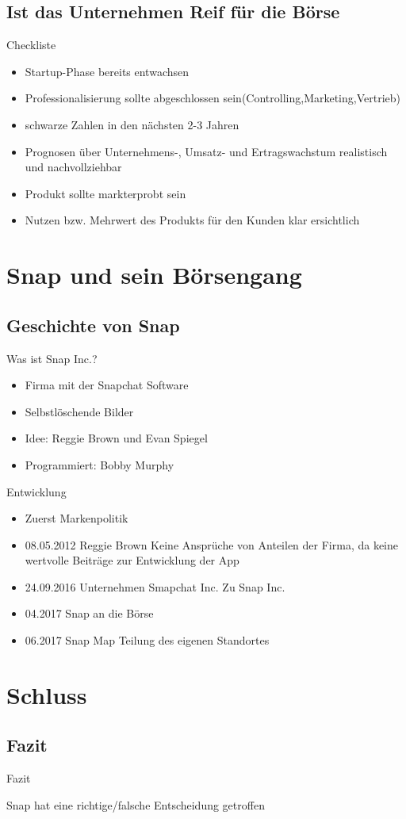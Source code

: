 \documentclass{beamer}
\begin{document}
\subsection{Ist das Unternehmen Reif für die Börse}
\begin{frame} {Checkliste}
\begin{itemize}
	\item Startup-Phase bereits entwachsen  
	\item Professionalisierung sollte abgeschlossen sein(Controlling,Marketing,Vertrieb)  
	\item schwarze Zahlen in den nächsten 2-3 Jahren   
	\item Prognosen über Unternehmens-, Umsatz- und Ertragswachstum realistisch und nachvollziehbar 
	 \item Produkt sollte markterprobt sein 
	 \item Nutzen bzw. Mehrwert des Produkts für den Kunden  klar ersichtlich 
\end{itemize}
\end{frame}


\section{Snap und sein Börsengang}

\subsection{Geschichte von Snap}
\begin{frame} {Was ist Snap Inc.?}
\begin{itemize}
	\item Firma mit der Snapchat Software 
	\item  Selbstlöschende Bilder
	\item  Idee: Reggie Brown und Evan Spiegel
	\item  Programmiert: Bobby Murphy
\end{itemize}
\end{frame}

\begin{frame} {Entwicklung}
\begin{itemize}
\item Zuerst Markenpolitik \pause
\item  08.05.2012 Reggie Brown Keine Ansprüche von Anteilen der Firma, da keine wertvolle Beiträge zur Entwicklung der App \pause
\item  24.09.2016 Unternehmen Smapchat Inc. Zu Snap Inc. \pause
\item  04.2017 Snap an die Börse \pause
\item 06.2017 Snap Map Teilung des eigenen Standortes \pause

\end{itemize}
\end{frame}



\section{Schluss}
\subsection{Fazit}
\begin{frame}{Fazit}

Snap hat eine richtige/falsche Entscheidung getroffen

\end{frame}
\end{document}
